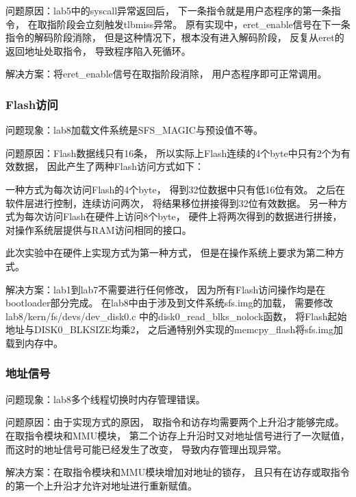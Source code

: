             问题原因：lab5中的syscall异常返回后，%
            下一条指令就是用户态程序的第一条指令，%
            在取指阶段会立刻触发tlbmiss异常。%
            原有实现中，eret\_enable信号在下一条指令的解码阶段消除，%
            但是这种情况下，根本没有进入解码阶段，%
            反复从eret的返回地址处取指令，%
            导致程序陷入死循环。

            解决方案：将eret\_enable信号在取指阶段消除，%
            用户态程序即可正常调用。
            
        \subsubsection{Flash访问}
            问题现象：lab8加载文件系统是SFS\_MAGIC与预设值不等。

            问题原因：Flash数据线只有16条，%
            所以实际上Flash连续的4个byte中只有2个为有效数据，%
            因此产生了两种Flash访问方式如下：

            一种方式为每次访问Flash的4个byte，%
            得到32位数据中只有低16位有效。%
            之后在软件层进行控制，连续访问两次，%
            将结果移位拼接得到32位有效数据。%
            另一种方式为每次访问Flash在硬件上访问8个byte，%
            硬件上将两次得到的数据进行拼接，%
            对操作系统层提供与RAM访问相同的接口。

            此次实验中在硬件上实现方式为第一种方式，%
            但是在操作系统上要求为第二种方式。

            解决方案：lab1到lab7不需要进行任何修改，%
            因为所有Flash访问操作均是在bootloader部分完成。%
            在lab8中由于涉及到文件系统sfs.img的加载，%
            需要修改lab8/kern/fs/devs/dev\_disk0.c%
            中的disk0\_read\_blks\_nolock函数，%
            将Flash起始地址与DISK0\_BLKSIZE均乘2，%
            之后通特别外实现的memcpy\_flash将sfs.img加载到内存中。

        \subsubsection{地址信号}
            问题现象：lab8多个线程切换时内存管理错误。

            问题原因：由于实现方式的原因，%
            取指令和访存均需要两个上升沿才能够完成。%
            在取指令模块和MMU模块，%
            第二个访存上升沿时又对地址信号进行了一次赋值，%
            而这时的地址信号可能已经发生了改变，%
            导致内存管理出现异常。

            解决方案：在取指令模块和MMU模块增加对地址的锁存，%
            且只有在访存或取指令的第一个上升沿才允许对地址进行重新赋值。

        
